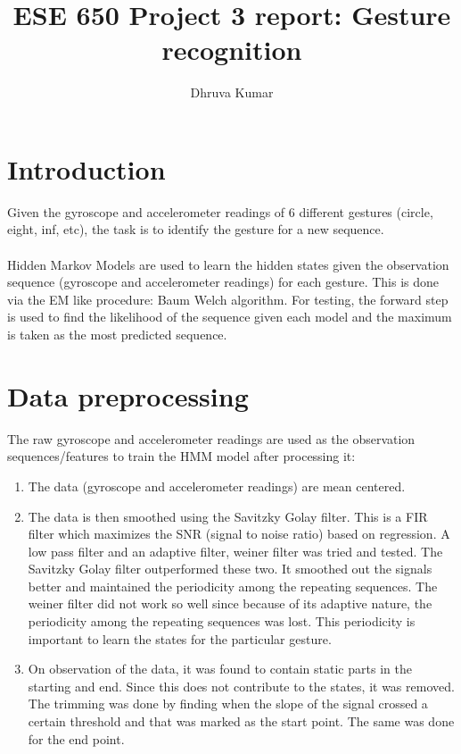 \documentclass[english]{article}
\title{ESE 650 Project 3 report: Gesture recognition}
\author{Dhruva Kumar}
\date{}
\begin{document}
\maketitle

\section{Introduction}
Given the gyroscope and accelerometer readings of 6 different gestures (circle, eight, inf, etc), the task is to identify the gesture for a new sequence. 
\\ \\ Hidden Markov Models are used to learn the hidden states given the observation sequence (gyroscope and accelerometer readings) for each gesture. This is done via the EM like procedure: Baum Welch algorithm. For testing, the forward step is used to find the likelihood of the sequence given each model and the maximum is taken as the most predicted sequence. 


\section{Data preprocessing}
The raw gyroscope and accelerometer readings are used as the observation sequences/features to train the HMM model after processing it:

\begin{enumerate}
\item
The data (gyroscope and accelerometer readings) are mean centered. 
\item
The data is then smoothed using the Savitzky Golay filter. This is a FIR filter which maximizes the SNR (signal to noise ratio) based on regression. 
A low pass filter and an adaptive filter, weiner filter was tried and tested. The Savitzky Golay filter outperformed these two. It smoothed out the signals better and maintained the periodicity among the repeating sequences. The weiner filter did not work so well since because of its adaptive nature, the periodicity among the repeating sequences was lost. This periodicity is important to learn the states for the particular gesture. 
\item
On observation of the data, it was found to contain static parts in the starting and end. Since this does not contribute to the states, it was removed. The trimming was done by finding when the slope of the signal crossed a certain threshold and that was marked as the start point. The same was done for the end point. 
\end{enumerate}
\end{document}
